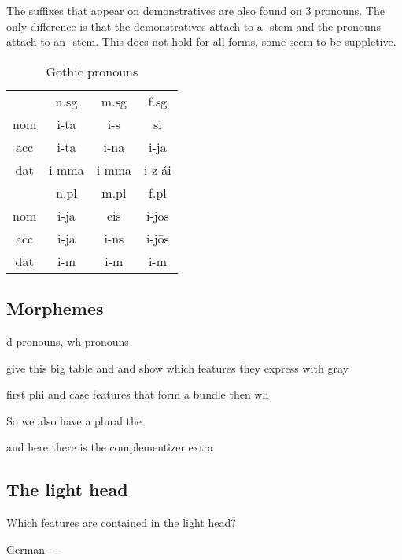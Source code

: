The suffixes that appear on demonstratives are also found on 3 pronouns. The only difference is that the demonstratives attach to a -stem and the pronouns attach to an -stem. This does not hold for all forms, some seem to be suppletive.

\begin{table}[H]
	\center
	\caption {Gothic  pronouns}
		\begin{tabular}{cccc}
		\toprule
							& \ac{n}.\ac{sg} 	& \ac{m}.\ac{sg}	& \ac{f}.\ac{sg}  \\
		 						\cmidrule{2-4}
    \ac{nom} 	& i-ta   	 			  & i-s  			  		& si		    			\\
    \ac{acc}	& i-ta    	   		& i-na  	  	 		& i-ja     				\\
    \ac{dat} 	& i-mma 		   		& i-mma  			   	& i-z-ái  	  		\\
		\bottomrule
    					& \ac{n}.\ac{pl}	& \ac{m}.\ac{pl}	& \ac{f}.\ac{pl}	\\
						    \cmidrule{2-4}
    \ac{nom} 	& i-ja  					&	eis    					&	i-jōs  					\\
    \ac{acc} 	& i-ja   					&	i-ns    				&	i-jōs 					\\
    \ac{dat} 	& i-m     				&	i-m      				&	i-m     				\\
    \bottomrule
		\end{tabular}
\end{table}




\subsection{Morphemes}

d-pronouns, wh-pronouns

give this big table and and show which features they express with gray

first phi and case features that form a bundle
then wh

So we also have a plural the

and here there is the complementizer extra

\subsection{The light head}

Which features are contained in the light head?

German  - 
 - 

